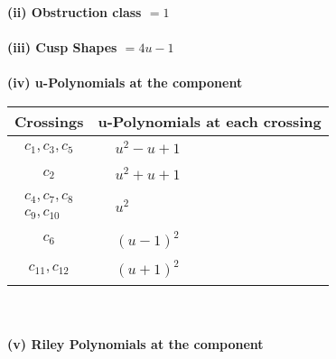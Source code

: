 \documentclass[1p]{elsarticle_modified}
\theoremstyle{definition}
\begin{document}
\flushleft \textbf{(ii) Obstruction class $= 1$}\\~\\
\flushleft \textbf{(iii) Cusp Shapes $= 4 u-1$}\\~\\
\newpage\renewcommand{\arraystretch}{1}
\flushleft \textbf{(iv) u-Polynomials at the component}\newline \\
\begin{tabular}{m{50pt}|m{274pt}}
Crossings & \hspace{64pt}u-Polynomials at each crossing \\
\hline $$\begin{aligned}c_{1},c_{3},c_{5}\end{aligned}$$&$\begin{aligned}
&u^2- u+1
\end{aligned}$\\
\hline $$\begin{aligned}c_{2}\end{aligned}$$&$\begin{aligned}
&u^2+u+1
\end{aligned}$\\
\hline $$\begin{aligned}c_{4},c_{7},c_{8}\\c_{9},c_{10}\end{aligned}$$&$\begin{aligned}
&u^2
\end{aligned}$\\
\hline $$\begin{aligned}c_{6}\end{aligned}$$&$\begin{aligned}
&(u-1)^2
\end{aligned}$\\
\hline $$\begin{aligned}c_{11},c_{12}\end{aligned}$$&$\begin{aligned}
&(u+1)^2
\end{aligned}$\\
\hline
\end{tabular}\\~\\
\newpage\renewcommand{\arraystretch}{1}
\flushleft \textbf{(v) Riley Polynomials at the component}\newline \\
\end{document}
